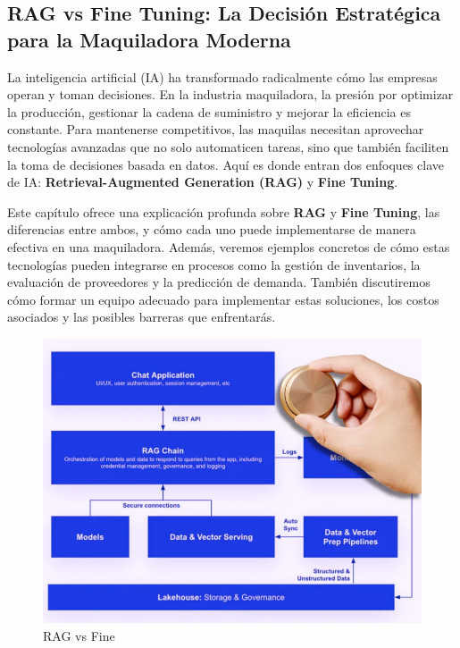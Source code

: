 \documentclass[
  10pt,
  letterpaper,
]{book}
\begin{document}
\subsection{\texorpdfstring{\textbf{RAG vs Fine Tuning: La Decisión
Estratégica para la Maquiladora
Moderna}}{RAG vs Fine Tuning: La Decisión Estratégica para la Maquiladora Moderna}}\label{rag-vs-fine-tuning-la-decisiuxf3n-estratuxe9gica-para-la-maquiladora-moderna}

La inteligencia artificial (IA) ha transformado radicalmente cómo las
empresas operan y toman decisiones. En la industria maquiladora, la
presión por optimizar la producción, gestionar la cadena de suministro y
mejorar la eficiencia es constante. Para mantenerse competitivos, las
maquilas necesitan aprovechar tecnologías avanzadas que no solo
automaticen tareas, sino que también faciliten la toma de decisiones
basada en datos. Aquí es donde entran dos enfoques clave de IA:
\textbf{Retrieval-Augmented Generation (RAG)} y \textbf{Fine Tuning}.

Este capítulo ofrece una explicación profunda sobre \textbf{RAG} y
\textbf{Fine Tuning}, las diferencias entre ambos, y cómo cada uno puede
implementarse de manera efectiva en una maquiladora. Además, veremos
ejemplos concretos de cómo estas tecnologías pueden integrarse en
procesos como la gestión de inventarios, la evaluación de proveedores y
la predicción de demanda. También discutiremos cómo formar un equipo
adecuado para implementar estas soluciones, los costos asociados y las
posibles barreras que enfrentarás.

\begin{figure}[H]

{\centering \includegraphics{Img/rag.jpg}

}

\caption{RAG vs Fine}

\end{figure}%
\end{document}
